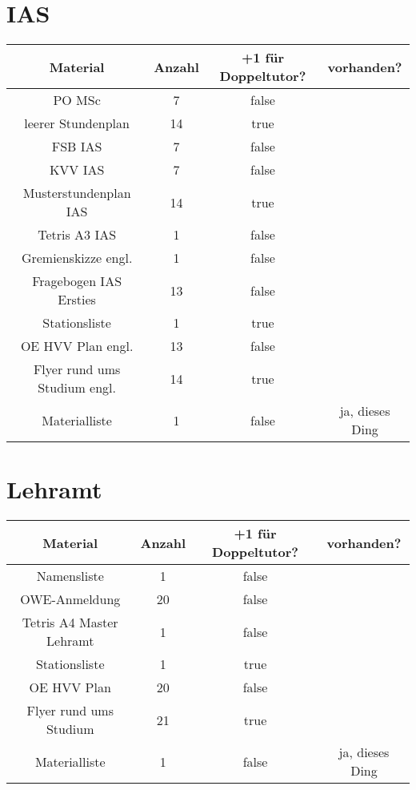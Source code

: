 \documentclass[10pt,a4paper,oneside,ngerman,numbers=noenddot]{scrartcl}
\begin{document}
\section{IAS}

	\begin{tabular}{c|c|c|c}
		\textbf{Material} & \textbf{Anzahl} & \textbf{+1 für Doppeltutor?} & \textbf{vorhanden?} \\
		\hline
		PO MSc & 7 & false & \\
		\hline
		leerer Stundenplan & 14 & true & \\
		\hline
		FSB IAS & 7 & false & \\
		\hline
		KVV IAS & 7 & false & \\
		\hline
		Musterstundenplan IAS & 14 & true & \\
		\hline
		Tetris A3 IAS & 1 & false & \\
		\hline
		Gremienskizze engl. & 1 & false & \\
		\hline
		Fragebogen IAS Ersties & 13 & false & \\
		\hline
		Stationsliste & 1 & true & \\
		\hline
		OE HVV Plan engl. & 13 & false & \\
		\hline
		Flyer rund ums Studium engl. & 14 & true & \\
		\hline
		Materialliste & 1 & false & ja, dieses Ding \\
	\end{tabular}

\section{Lehramt}

	\begin{tabular}{c|c|c|c}
		\textbf{Material} & \textbf{Anzahl} & \textbf{+1 für Doppeltutor?} & \textbf{vorhanden?} \\
		\hline
		Namensliste & 1 & false & \\
		\hline
		OWE-Anmeldung & 20 & false & \\
		\hline
		Tetris A4 Master Lehramt & 1 & false & \\
		\hline
		Stationsliste & 1 & true & \\
		\hline
		OE HVV Plan & 20 & false & \\
		\hline
		Flyer rund ums Studium & 21 & true & \\
		\hline
		Materialliste & 1 & false & ja, dieses Ding \\
	\end{tabular}
\end{document}
